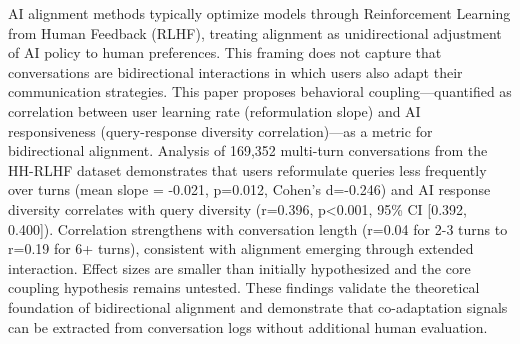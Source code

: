 
AI alignment methods typically optimize models through Reinforcement Learning from Human Feedback (RLHF), treating alignment as unidirectional adjustment of AI policy to human preferences. This framing does not capture that conversations are bidirectional interactions in which users also adapt their communication strategies. This paper proposes behavioral coupling---quantified as correlation between user learning rate (reformulation slope) and AI responsiveness (query-response diversity correlation)---as a metric for bidirectional alignment. Analysis of 169,352 multi-turn conversations from the HH-RLHF dataset demonstrates that users reformulate queries less frequently over turns (mean slope = -0.021, p=0.012, Cohen's d=-0.246) and AI response diversity correlates with query diversity (r=0.396, p<0.001, 95\% CI [0.392, 0.400]). Correlation strengthens with conversation length (r=0.04 for 2-3 turns to r=0.19 for 6+ turns), consistent with alignment emerging through extended interaction. Effect sizes are smaller than initially hypothesized and the core coupling hypothesis remains untested. These findings validate the theoretical foundation of bidirectional alignment and demonstrate that co-adaptation signals can be extracted from conversation logs without additional human evaluation.
